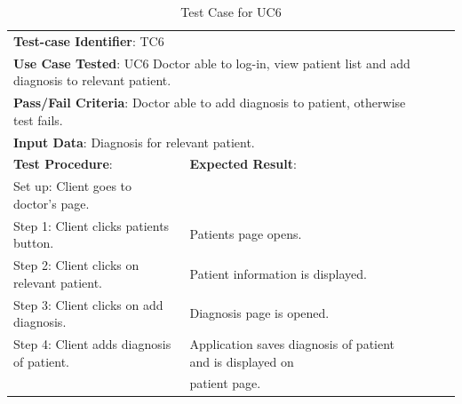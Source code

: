 \documentclass[a4paper]{article}
\begin{document}
\begin{table}[h!]
\centering
\caption*{Test Case for UC6}
\label{TC6}
\begin{tabular}{lllll}
\cline{1-2}

\multicolumn{2}{|l|}{\textbf{Test-case Identifier}: TC6}  &  &  &  \\

\multicolumn{2}{|l|}{\textbf{Use Case Tested}: UC6 Doctor able to log-in, view patient list and add diagnosis to relevant patient.}  &  &  &  \\

\multicolumn{2}{|l|}{\textbf{Pass/Fail Criteria}: Doctor able to add diagnosis to patient, otherwise test fails.}  &  &  &  \\

\multicolumn{2}{|l|}{\textbf{Input Data}: Diagnosis for relevant patient.}  &  &  &  \\

\cline{1-2}

\multicolumn{1}{|l|}{\textbf{Test Procedure}:} & \multicolumn{1}{l|}{\textbf{Expected Result}:} &  &  &  \\ 

\cline{1-2}

\multicolumn{1}{|l|}{Set up: Client goes to doctor's page.} & \multicolumn{1}{l|}{} &  &  &  \\

\multicolumn{1}{|l|}{Step 1: Client clicks patients button.} & \multicolumn{1}{l|}{Patients page opens.} &  &  &  \\

\multicolumn{1}{|l|}{Step 2: Client clicks on relevant patient.} & \multicolumn{1}{l|}{Patient information is displayed.} &  &  &  \\

\multicolumn{1}{|l|}{Step 3: Client clicks on add diagnosis.} & \multicolumn{1}{l|}{Diagnosis page is opened.} &  &  &  \\

\multicolumn{1}{|l|}{Step 4: Client adds diagnosis of patient.} & \multicolumn{1}{l|}{Application saves diagnosis of patient and is displayed on} &  &  &  \\

\multicolumn{1}{|l|}{} & \multicolumn{1}{l|}{patient page.} &  &  &  \\

\cline{1-2}

\end{tabular}
\end{table}
\end{document}
